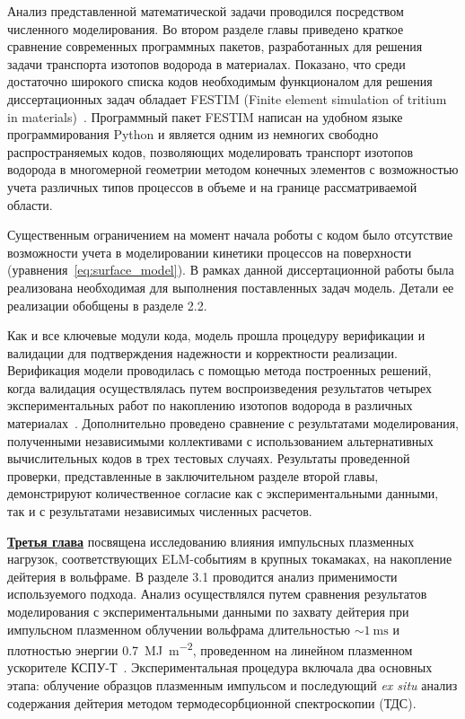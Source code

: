 Анализ представленной математической задачи проводился посредством численного моделирования. Во втором разделе главы приведено краткое сравнение современных программных пакетов, разработанных для решения задачи транспорта изотопов водорода в материалах. Показано, что среди достаточно широкого списка кодов необходимым функционалом для решения диссертационных задач обладает FESTIM (Finite element simulation of tritium in materials)~\cite{Kulagin2024}. Программный пакет FESTIM написан на удобном языке программирования Python и является одним из немногих свободно распространяемых кодов, позволяющих моделировать транспорт изотопов водорода в многомерной геометрии методом конечных элементов с возможностью учета различных типов процессов в объеме и на границе рассматриваемой области. 

Существенным ограничением на момент начала роботы с кодом было отсутствие возможности учета в моделировании кинетики процессов на поверхности (уравнения~\cref{eq:surface_model}). В рамках данной диссертационной работы была реализована необходимая для выполнения поставленных задач модель. Детали ее реализации обобщены в разделе 2.2. 

Как и все ключевые модули кода, модель прошла процедуру верификации и валидации для подтверждения надежности и корректности реализации. Верификация модели проводилась с помощью метода построенных решений, когда валидация осуществлялась путем воспроизведения результатов четырех экспериментальных работ по накоплению изотопов водорода в различных материалах~\cite{Kulagin2025_IJHE}. Дополнительно проведено сравнение с результатами моделирования, полученными независимыми коллективами с использованием альтернативных вычислительных кодов в трех тестовых случаях. Результаты проведенной проверки, представленные в заключительном разделе второй главы, демонстрируют количественное согласие как с экспериментальными данными, так и с результатами независимых численных расчетов. 

\underline{\textbf{Третья глава}} посвящена исследованию влияния импульсных плазменных нагрузок, соответствующих ELM-событиям в крупных токамаках, на накопление дейтерия в вольфраме. В разделе 3.1 проводится анализ применимости используемого подхода. Анализ осуществлялся путем сравнения результатов моделирования с экспериментальными данными по захвату дейтерия при импульсном плазменном облучении вольфрама длительностью \( \sim\SI{1}{\milli\second}\) и плотностью энергии \SI{0.7}{\mega\joule\per\meter\squared}, проведенном на линейном плазменном ускорителе КСПУ-Т~\cite{Poskakalov2020}. Экспериментальная процедура включала два основных этапа: облучение образцов плазменным импульсом и последующий \textit{ex situ} анализ содержания дейтерия методом термодесорбционной спектроскопии (ТДС). 

